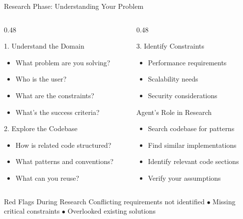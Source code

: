 \documentclass[aspectratio=169,10pt]{beamer}
\begin{document}
\begin{frame}{Research Phase: Understanding Your Problem}
    \begin{columns}[T]
        \begin{column}{0.48\textwidth}
            \begin{block}{1. Understand the Domain}
                \begin{itemize}
                    \item What problem are you solving?
                    \item Who is the user?
                    \item What are the constraints?
                    \item What's the success criteria?
                \end{itemize}
            \end{block}
            \begin{block}{2. Explore the Codebase}
                \begin{itemize}
                    \item How is related code structured?
                    \item What patterns and conventions?
                    \item What can you reuse?
                \end{itemize}
            \end{block}
        \end{column}
        \begin{column}{0.48\textwidth}
            \begin{block}{3. Identify Constraints}
                \begin{itemize}
                    \item Performance requirements
                    \item Scalability needs
                    \item Security considerations
                \end{itemize}
            \end{block}
            \begin{block}{Agent's Role in Research}
                \begin{itemize}
                    \item Search codebase for patterns
                    \item Find similar implementations
                    \item Identify relevant code sections
                    \item Verify your assumptions
                \end{itemize}
            \end{block}
        \end{column}
    \end{columns}
    \vspace{0.2cm}
    \begin{alertblock}{Red Flags During Research}
        Conflicting requirements not identified $\bullet$ Missing critical constraints $\bullet$ Overlooked existing solutions
    \end{alertblock}


\end{frame}
\end{document}
